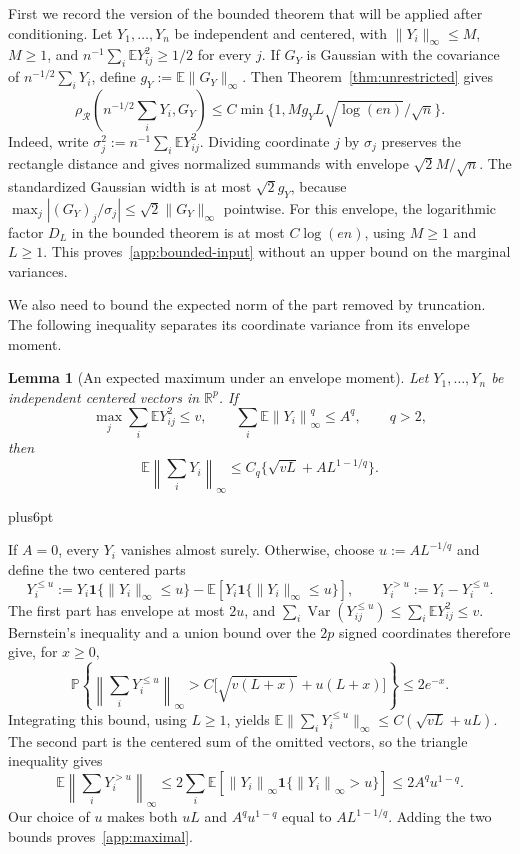 \documentclass[11pt,letterpaper,twoside,leqno]{article}
\makeatletter
\theoremstyle{bookplain}
\newtheorem{lemma}{Lemma}
\theoremstyle{bookremark}
\renewenvironment{proof}[1][\proofname]{\par
  \pushQED{\qed}\normalfont\topsep6pt plus6pt\relax
  \trivlist\item[\hskip\labelsep\bfseries #1\@addpunct{.}]\ignorespaces
}{\popQED\endtrivlist\@endpefalse}
\newcommand{\E}{\mathbb E}
\newcommand{\Pp}{\mathbb P}
\newcommand{\R}{\mathbb R}
\newcommand{\Var}{\operatorname{Var}}
\newcommand{\norm}[1]{\left\lVert#1\right\rVert}
\newcommand{\rh}{\rho_{\mathcal R}}
\newcommand{\ind}{\mathbf 1}
\makeatother
\begin{document}
First we record the version of the bounded theorem that will be
applied after conditioning. Let $Y_1,\ldots,Y_n$ be independent and
centered, with $\|Y_i\|_\infty\le M$, $M\ge1$, and
$n^{-1}\sum_i\E Y_{ij}^2\ge1/2$ for every $j$. If $G_Y$ is
Gaussian with the covariance of $n^{-1/2}\sum_iY_i$, define
$g_Y:=\E\|G_Y\|_\infty$. Then Theorem~\ref{thm:unrestricted} gives
\begin{equation}
 \rh\left(n^{-1/2}\sum_iY_i,G_Y\right)
 \le C\min\{1,Mg_YL\sqrt{\log(en)}/\sqrt n\}.
 \label{app:bounded-input}
\end{equation}
Indeed, write $\sigma_j^2:=n^{-1}\sum_i\E Y_{ij}^2$. Dividing
coordinate $j$ by $\sigma_j$ preserves the rectangle distance and
gives normalized summands with envelope $\sqrt2M/\sqrt n$.
The standardized Gaussian width is at most $\sqrt2g_Y$, because
$\max_j|(G_Y)_j/\sigma_j|\le\sqrt2\|G_Y\|_\infty$ pointwise.
For this envelope, the logarithmic factor $D_L$ in the bounded
theorem is at most $C\log(en)$, using $M\ge1$ and $L\ge1$.
This proves~\eqref{app:bounded-input} without an upper bound on
the marginal variances.

We also need to bound the expected norm of the part removed by
truncation. The following inequality separates its coordinate
variance from its envelope moment.

\begin{lemma}[An expected maximum under an envelope moment]\label{lem:maximum}
Let $Y_1,\ldots,Y_n$ be independent centered vectors in $\R^p$.
If
\[
 \max_j\sum_i\E Y_{ij}^2\le v,\qquad
 \sum_i\E\norm{Y_i}_\infty^q\le A^q,\qquad q>2,
\]
then
\begin{equation}
 \E\norm{\sum_iY_i}_\infty
 \le C_q\{\sqrt{vL}+AL^{1-1/q}\}.
 \label{app:maximal}
\end{equation}
\end{lemma}
\begin{proof}
If $A=0$, every $Y_i$ vanishes almost surely. Otherwise, choose
$u:=AL^{-1/q}$ and define the two centered parts
\[
 Y_i^{\le u}:=Y_i\ind\{\|Y_i\|_\infty\le u\}
       -\E[Y_i\ind\{\|Y_i\|_\infty\le u\}],
 \qquad Y_i^{>u}:=Y_i-Y_i^{\le u}.
\]
The first part has envelope at most $2u$, and
$\sum_i\Var(Y_{ij}^{\le u})\le\sum_i\E Y_{ij}^2\le v$.
Bernstein's inequality and a union bound over the $2p$ signed
coordinates therefore give, for $x\ge0$,
\[
 \Pp\left\{\left\|\sum_iY_i^{\le u}\right\|_\infty
       >C\bigl[\sqrt{v(L+x)}+u(L+x)\bigr]\right\}
 \le2e^{-x}.
\]
Integrating this bound, using $L\ge1$, yields
$\E\|\sum_iY_i^{\le u}\|_\infty\le C(\sqrt{vL}+uL)$.
The second part is the centered sum of the omitted vectors, so
the triangle inequality gives
\[
 \E\left\|\sum_iY_i^{>u}\right\|_\infty
 \le2\sum_i\E[\norm{Y_i}_\infty\ind\{\norm{Y_i}_\infty>u\}]
 \le2A^qu^{1-q}.
\]
Our choice of $u$ makes both $uL$ and $A^qu^{1-q}$ equal to
$AL^{1-1/q}$. Adding the two bounds proves~\eqref{app:maximal}.
\end{proof}
\end{document}
